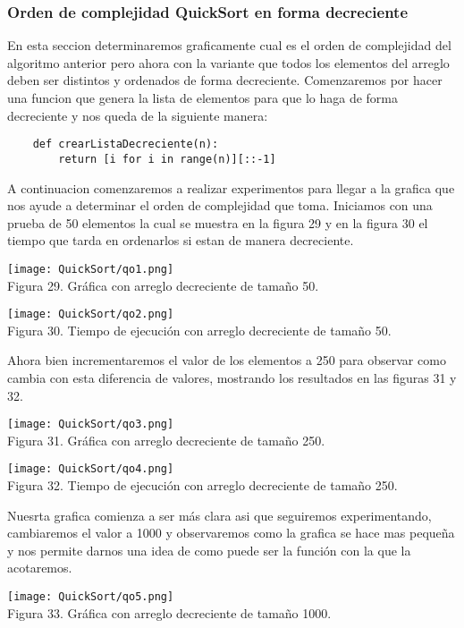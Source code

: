 \documentclass[12pt,twoside]{article}
\begin{document}
\subsubsection{Orden de complejidad QuickSort en forma decreciente}
En esta seccion determinaremos graficamente cual es el orden de complejidad del algoritmo anterior pero ahora con la variante que todos los elementos del arreglo deben ser distintos y ordenados de forma decreciente.
Comenzaremos por hacer una funcion que genera la lista de elementos para que lo haga de forma decreciente y nos queda de la siguiente manera:
\begin{lstlisting}
	def crearListaDecreciente(n):
	    return [i for i in range(n)][::-1]
\end{lstlisting}
A continuacion comenzaremos a realizar experimentos para llegar a la grafica que nos ayude a determinar el orden de complejidad que toma.
Iniciamos con una prueba de 50 elementos la cual se muestra en la figura 29 y en la figura 30 el tiempo que tarda en ordenarlos si estan de manera decreciente.
\begin{center}
    \texttt{[image: QuickSort/qo1.png]}\\
    Figura 29. Gr\'afica con arreglo decreciente de tamaño 50.
\end{center}
\begin{center}
    \texttt{[image: QuickSort/qo2.png]}\\
    Figura 30. Tiempo de ejecuci\'on con arreglo decreciente de tamaño 50.
\end{center}
Ahora bien incrementaremos el valor de los elementos a 250 para observar como cambia con esta diferencia de valores, mostrando los resultados en las figuras 31 y 32.
\begin{center}
    \texttt{[image: QuickSort/qo3.png]}\\
    Figura 31. Gr\'afica con arreglo decreciente de tamaño 250.
\end{center}
\begin{center}
    \texttt{[image: QuickSort/qo4.png]}\\
    Figura 32. Tiempo de ejecuci\'on con arreglo decreciente de tamaño 250.
\end{center}
Nuesrta grafica comienza a ser m\'as clara asi que seguiremos experimentando, cambiaremos el valor a 1000 y observaremos como la grafica se hace mas pequeña y nos permite darnos una idea de como puede ser la funci\'on con la que la acotaremos.
\begin{center}
    \texttt{[image: QuickSort/qo5.png]}\\
    Figura 33. Gr\'afica con arreglo decreciente de tamaño 1000.
\end{center}
\end{document}
